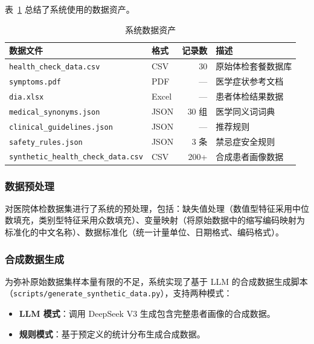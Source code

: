 \documentclass[12pt,a4paper]{article}
\begin{document}
表~\ref{tab:data} 总结了系统使用的数据资产。

\begin{table}[H]
    \centering
    \caption{系统数据资产}
    \label{tab:data}
    \begin{tabular}{llrl}
        \toprule
        \textbf{数据文件} & \textbf{格式} & \textbf{记录数} & \textbf{描述} \\
        \midrule
        \texttt{health\_check\_data.csv} & CSV & 30 & 原始体检套餐数据库 \\
        \texttt{symptoms.pdf} & PDF & --- & 医学症状参考文档 \\
        \texttt{dia.xlsx} & Excel & --- & 患者体检结果数据 \\
        \texttt{medical\_synonyms.json} & JSON & 30 组 & 医学同义词词典 \\
        \texttt{clinical\_guidelines.json} & JSON & --- & 推荐规则 \\
        \texttt{safety\_rules.json} & JSON & 3 条 & 禁忌症安全规则 \\
        \texttt{synthetic\_health\_check\_data.csv} & CSV & 200+ & 合成患者画像数据 \\
        \bottomrule
    \end{tabular}
\end{table}

\subsubsection{数据预处理}

对医院体检数据集进行了系统的预处理，包括：缺失值处理（数值型特征采用中位数填充，类别型特征采用众数填充）、变量映射（将原始数据中的缩写编码映射为标准化的中文名称）、数据标准化（统一计量单位、日期格式、编码格式）。

\subsubsection{合成数据生成}

为弥补原始数据集样本量有限的不足，系统实现了基于 LLM 的合成数据生成脚本（\texttt{scripts/generate\_synthetic\_data.py}），支持两种模式：

\begin{itemize}[leftmargin=2em]
    \item \textbf{LLM 模式}：调用 DeepSeek V3 生成包含完整患者画像的合成数据。
    \item \textbf{规则模式}：基于预定义的统计分布生成合成数据。
\end{itemize}
\end{document}
